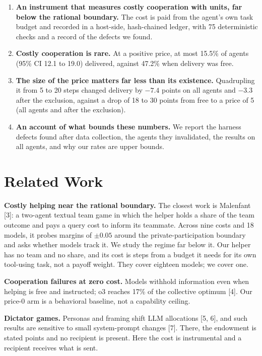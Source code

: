 \documentclass[11pt]{article}
\begin{document}
\begin{enumerate}
  \item \textbf{An instrument that measures costly cooperation with units, far below the rational
  boundary.} The cost is paid from the agent's own task budget and recorded in a host-side,
  hash-chained ledger, with 75 deterministic checks and a record of the defects we found.
  \item \textbf{Costly cooperation is rare.} At a positive price, at most 15.5\% of agents (95\% CI
  12.1 to 19.0) delivered, against 47.2\% when delivery was free.
  \item \textbf{The size of the price matters far less than its existence.} Quadrupling it from 5 to
  20 steps changed delivery by $-7.4$ points on all agents and $-3.3$ after the exclusion, against a
  drop of 18 to 30 points from free to a price of 5 (all agents and after the exclusion).
  \item \textbf{An account of what bounds these numbers.} We report the harness defects found after
  data collection, the agents they invalidated, the results on all agents, and why our rates are
  upper bounds.
\end{enumerate}

\section{Related Work}

\textbf{Costly helping near the rational boundary.} The closest work is Malenfant [3]: a two-agent
textual team game in which the helper holds a share of the team outcome and pays a query cost to
inform its teammate. Across nine costs and 18 models, it probes margins of $\pm 0.05$ around the
private-participation boundary and asks whether models track it. We study the regime far below it.
Our helper has no team and no share, and its cost is steps from a budget it needs for its own
tool-using task, not a payoff weight. They cover eighteen models; we cover one.

\textbf{Cooperation failures at zero cost.} Models withhold information even when helping is free
and instructed; o3 reaches 17\% of the collective optimum [4]. Our price-0 arm is a behavioral
baseline, not a capability ceiling.

\textbf{Dictator games.} Personas and framing shift LLM allocations [5, 6], and such results are
sensitive to small system-prompt changes [7]. There, the endowment is stated points and no recipient
is present. Here the cost is instrumental and a recipient receives what is sent.
\end{document}
